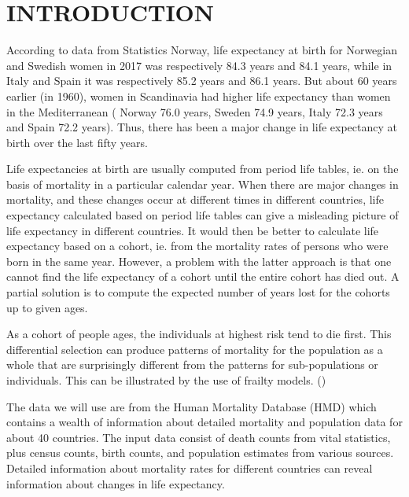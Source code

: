 \chapter{INTRODUCTION}
\label{sec:intro}

According to data from Statistics Norway, life expectancy at birth for Norwegian and Swedish women in 2017 was respectively 84.3 years and 84.1 years, while in Italy and Spain it was respectively 85.2 years and 86.1 years. But about 60 years earlier (in 1960), women in Scandinavia had higher life expectancy than women in the Mediterranean ( Norway 76.0 years, Sweden 74.9 years, Italy 72.3 years and Spain 72.2 years). Thus, there has been a major change in life expectancy at birth over the last fifty years. \parencite{S19}

Life expectancies at birth are usually computed from period life tables, ie. on the basis of mortality in a particular calendar year. When there are major changes in mortality, and these changes occur at different times in different countries, life expectancy calculated based on period life tables can give a misleading picture of life expectancy in different countries. It would then be better to calculate life expectancy based on a cohort, ie. from the mortality rates of persons who were born in the same year. However, a problem with the latter approach is that one cannot find the life expectancy of a cohort until the entire cohort has died out. A partial solution is to compute the expected number of years lost for the cohorts up to given ages. \parencite{BK19}

As a cohort of people ages, the individuals at highest risk tend to die first. This differential selection can produce patterns of mortality for the population as a whole that are surprisingly different from the patterns for sub-populations or individuals. This can be illustrated by the use of frailty models. (\cite{AOH08})

The data we will use are from the Human Mortality Database (HMD) which contains a wealth of information about detailed mortality and population data for about 40 countries. The input data consist of death counts from vital statistics, plus census counts, birth counts, and population estimates from various sources. Detailed information about mortality rates for different countries can reveal information about changes in life expectancy.

